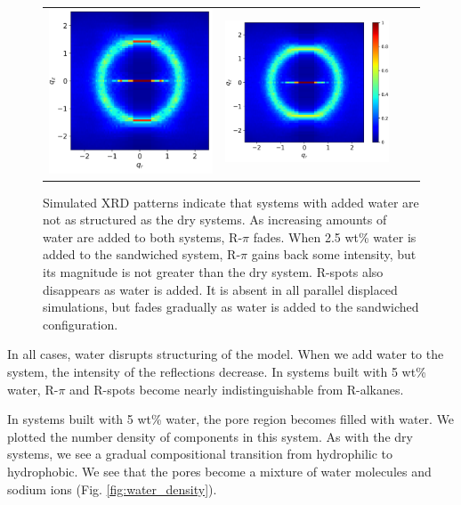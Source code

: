 \documentclass[journal=jpcbfk,manusciprt=article]{achemso}
\begin{document}
\begin{figure}
\begin{tabular}{@{}c@{ }c@{ }c@{ }c@{}}
  	\includegraphics[width=.28\linewidth]{solvated_layered_rzplot_25.png}&
  	\includegraphics[width=.325\linewidth]{solvated_layered_rzplot_5.png}\\[-1ex]
  	\end{tabular}
	\caption{Simulated XRD patterns indicate that systems with added water
		are not as structured as the dry systems. As increasing amounts of water are 
		added to both systems, R-$\pi$ fades. When 2.5 wt\% water is added to the
		sandwiched system, R-$\pi$ gains back some intensity, but its magnitude is not
		greater than the dry system. R-spots also disappears as water is added. It is
		absent in all parallel displaced simulations, but fades gradually as water is
		added to the sandwiched configuration.}%
  \label{fig:solvation}

  \end{figure}
 
  In all cases, water disrupts structuring of the model.  When we add water to
  the system, the intensity of the reflections decrease. In systems built with 5
  wt\% water, R-$\pi$ and R-spots become nearly indistinguishable from R-alkanes.

  In systems built with 5 wt\% water, the pore region becomes filled with
  water. We plotted the number density of components in this system. As with the 
  dry systems, we see a gradual compositional transition from hydrophilic to hydrophobic.  
  We see that the pores become a mixture of water molecules and sodium ions (Fig.
  \ref{fig:water_density}). 
  
\end{document}
